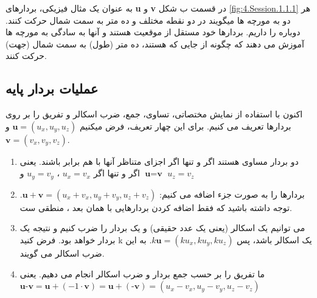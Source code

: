 {\begin{spacing}{1.4}
        به عنوان یک مثال فیزیکی، بردارهای \textbf{u} و \textbf{v} در قسمت ب شکل \ref{fig:4.Session.1.1.1} هر دو به مورچه ها میگویند در دو نقطه مختلف  و  ده متر به سمت شمال حرکت کنند.
        دوباره  را داریم.
        بردارها خود مستقل از موقعیت هستند و
        آنها به سادگی به مورچه ها آموزش می دهند که چگونه از جایی که هستند، ده متر (طول) به سمت شمال (جهت) حرکت کنند.

    \end{spacing}
}

\subsection{\textbf{عملیات بردار پایه}}
{
    \Large
    \begin{spacing}{1.5}
        اکنون با استفاده از نمایش مختصاتی، تساوی، جمع، ضرب اسکالر و تفریق را بر روی بردارها تعریف می کنیم.
        برای این چهار تعریف، فرض میکنیم $\textbf{u}=(u_{x},u_{y},u_{z})$ و  $\textbf{v}=(v_{x},v_{y},v_{z})$.

        \begin{enumerate}[label=\textbf{\arabic*}.]
            \item {دو بردار مساوی هستند اگر و تنها اگر اجزای متناظر آنها با هم برابر باشند.
            یعنی $\textbf{u}=\textbf{v}$ اگر و تنها اگر $u_{x}=v_{x}$ ، $u_{y}=v_{y}$ و $u_{z}=v_{z}$}
            \item {بردارها را به صورت جزء اضافه می کنیم: $\textbf{u}+\textbf{v}=(u_{x}+v_{x},u_{y}+v_{y},u_{z}+v_{z})$.
            توجه داشته باشید که فقط اضافه کردن بردارهایی با همان بعد ، منطقی ست.}
            \item {می توانیم یک اسکالر (یعنی یک عدد حقیقی) و یک بردار را ضرب کنیم و نتیجه یک بردار خواهد بود.
            فرض کنید k یک اسکالر باشد، پس $k\textbf{u}=(ku_{x},ku_{y},ku_{z})$. به این ضرب اسکالر می گویند.}
            \item {ما تفریق را بر حسب جمع بردار و ضرب اسکالر انجام می دهیم.
            یعنی\\$\textbf{u}\textbf{-v}=\textbf{u}+(-1\cdot\textbf{v})=\textbf{u}+(\textbf{-v})=(u_{x}-v_{x},u_{y}-v_{y},u_{z}-v_{z})$}
        \end{enumerate}


\end{spacing}}
